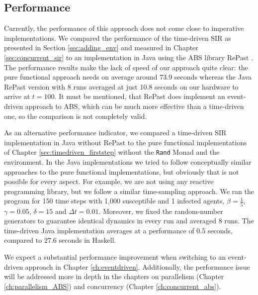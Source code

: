 \subsection{Performance}
\label{sub:timedriven_performance}
Currently, the performance of this approach does not come close to imperative implementations. We compared the performance of the time-driven SIR as presented in Section \ref{sec:adding_env} and measured in Chapter \ref{sec:concurrent_sir} to an implementation in Java using the ABS library RePast \cite{north_complex_2013}. The performance results make the lack of speed of our approach quite clear: the pure functional approach needs on average around 73.9 seconds whereas the Java RePast version with 8 runs averaged at just 10.8 seconds on our hardware to arrive at $t = 100$. It must be mentioned, that RePast does implement an event-driven approach to ABS, which can be much more effective \cite{meyer_event-driven_2014} than a time-driven one, so the comparison is not completely valid.

As an alternative performance indicator, we compared a time-driven SIR implementation in Java without RePast to the pure functional implementations of Chapter \ref{sec:timedriven_firststep} without the \texttt{Rand} Monad and the environment. In the Java implementations we tried to follow conceptually similar approaches to the pure functional implementations, but obviously that is not possible for every aspect. For example, we are not using any reactive programming library, but we follow a similar time-sampling approach. We ran the program for 150 time steps with 1,000 susceptible and 1 infected agents, $\beta = \frac{1}{5}$, $\gamma = 0.05$, $\delta = 15$ and $\Delta t = 0.01$. Moreover, we fixed the random-number generators to guarantee identical dynamics in every run and averaged 8 runs. The time-driven Java implementation averages at a performance of 0.5 seconds, compared to 27.6 seconds in Haskell.

We expect a substantial performance improvement when switching to an event-driven approach \cite{meyer_event-driven_2014} in Chapter \ref{ch:eventdriven}. Additionally, the performance issue will be addressed more in depth in the chapters on parallelism (Chapter \ref{ch:parallelism_ABS}) and concurrency (Chapter \ref{ch:concurrent_abs}).